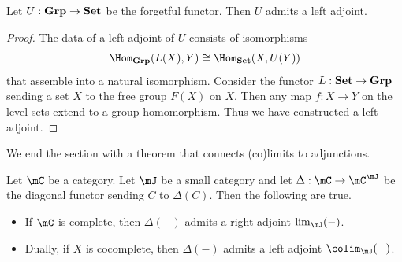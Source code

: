 \documentclass[a4paper]{article}
\begin{document}
\begin{prp}{}{} Let $U:\bold{Grp}\to\bold{Set}$ be the forgetful functor. Then $U$ admits a left adjoint. 
\begin{proof}
The data of a left adjoint of $U$ consists of isomorphisms $$\Hom_\bold{Grp}(L(X),Y)\cong\Hom_\bold{Set}(X,U(Y))$$ that assemble into a natural isomorphism. Consider the functor $L:\bold{Set}\to\bold{Grp}$ sending a set $X$ to the free group $F(X)$ on $X$. Then any map $f:X\to Y$ on the level sets extend to a group homomorphism. Thus we have constructed a left adjoint. 
\end{proof}
\end{prp}

We end the section with a theorem that connects (co)limits to adjunctions. 

\begin{thm}{}{} Let $\mC$ be a category. Let $\mJ$ be a small category and let $\Delta:\mC\to\mC^\mJ$ be the diagonal functor sending $C$ to $\Delta(C)$. Then the following are true. 
\begin{itemize}
\item If $\mC$ is complete, then $\Delta(-)$ admits a right adjoint $\lim_\mJ(-)$. 
\item Dually, if $X$ is cocomplete, then $\Delta(-)$ admits a left adjoint $\colim_\mJ(-)$. 
\end{itemize}
\end{thm}
\end{document}
